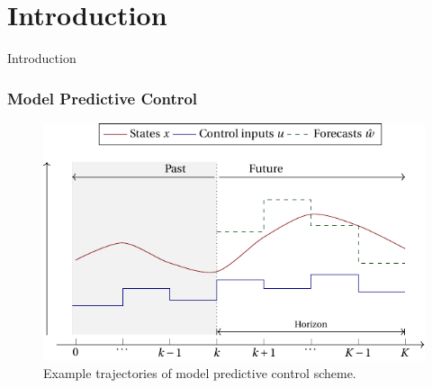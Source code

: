 
\section{Introduction}

\begin{frame}{Introduction}
    
\end{frame}

\begin{frame}
    \frametitle{Model Predictive Control}
    
    \begin{figure}
        \centering
        \includegraphics[scale=0.8]{figures/mpc1.pdf}
        \caption{Example trajectories of model predictive control scheme.}
    \end{figure}

\end{frame}
